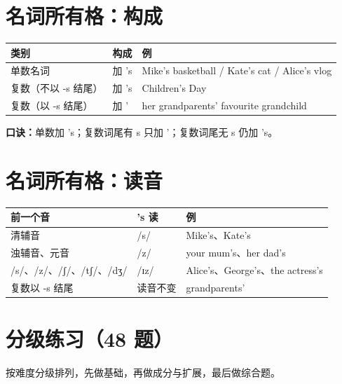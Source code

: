 \documentclass[11pt,a4paper]{ctexart}
\begin{document}
\section{名词所有格：构成}
\begin{center}
\begin{tabular}{p{4.6cm}p{2.6cm}p{6.4cm}}
\hline
\textbf{类别} & \textbf{构成} & \textbf{例}\\
\hline
单数名词 & 加 's & Mike's basketball / Kate's cat / Alice's vlog\\
复数（不以 -s 结尾） & 加 's & Children's Day\\
复数（以 -s 结尾） & 加 ' & her grandparents' favourite grandchild\\
\hline
\end{tabular}
\end{center}
\textbf{口诀：}单数加 's；复数词尾有 s 只加 '；复数词尾无 s 仍加 's。

\section{名词所有格：读音}
\begin{center}
\begin{tabular}{p{5.4cm}p{2.6cm}p{5.2cm}}
\hline
\textbf{前一个音} & \textbf{'s 读} & \textbf{例}\\
\hline
清辅音 & /s/ & Mike's、Kate's\\
浊辅音、元音 & /z/ & your mum's、her dad's\\
/s/、/z/、/ʃ/、/tʃ/、/dʒ/ & /ɪz/ & Alice's、George's、the actress's\\
复数以 -s 结尾 & 读音不变 & grandparents'\\
\hline
\end{tabular}
\end{center}


\newpage
\section{分级练习（48 题）}
\noindent 按难度分级排列，先做基础，再做成分与扩展，最后做综合题。
\end{document}
